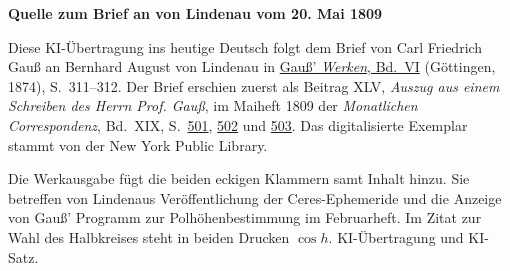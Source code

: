 \clearpage\thispagestyle{empty}
\begin{center}\textbf{Quelle zum Brief an von Lindenau vom 20. Mai 1809}\end{center}
\noindent Diese KI-Übertragung ins heutige Deutsch folgt dem Brief von Carl Friedrich Gauß an Bernhard August von Lindenau in \href{https://gdz.sub.uni-goettingen.de/id/PPN236007467}{Gauß’ \textit{Werken}, Bd.~VI} (Göttingen, 1874), S.~311--312. Der Brief erschien zuerst als Beitrag XLV, \textit{Auszug aus einem Schreiben des Herrn Prof. Gauß}, im Maiheft 1809 der \textit{Monatlichen Correspondenz}, Bd.~XIX, S.~\href{https://archive.org/download/bub_gb_caMAAAAAMAAJ/page/n515.jpg}{501}, \href{https://archive.org/download/bub_gb_caMAAAAAMAAJ/page/n516.jpg}{502} und \href{https://archive.org/download/bub_gb_caMAAAAAMAAJ/page/n517.jpg}{503}. Das digitalisierte Exemplar stammt von der New York Public Library.
\par\smallskip\noindent Die Werkausgabe fügt die beiden eckigen Klammern samt Inhalt hinzu. Sie betreffen von Lindenaus Veröffentlichung der Ceres-Ephemeride und die Anzeige von Gauß’ Programm zur Polhöhenbestimmung im Februarheft. Im Zitat zur Wahl des Halbkreises steht in beiden Drucken $\cos h$. KI-Übertragung und KI-Satz.
\clearpage
